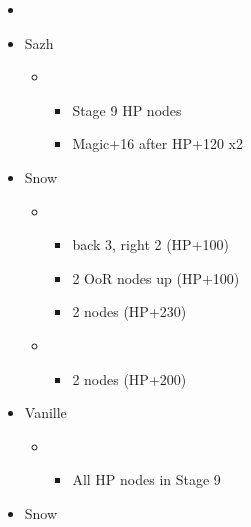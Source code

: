 \begin{menu}
	\begin{itemize}
	\paradigm
		\begin{itemize}
			\item {}%
				{\paradigmline{(\rav)}{\sen}{(\rav)}}%
				{\paradigmline{\com}{\com}{\sab}}%
				{\paradigmline{\syn}{\sen}{(\med)}}%
				{\paradigmline{\rav}{(\sen)}{(\med)}}%
				{\paradigmline[4]{\sab}{\sen}{\sab}}%
				{\paradigmline{\rav}{\sen}{\rav}}%
		\end{itemize}
	\crystarium
		\begin{itemize}
			\item Sazh
				\begin{itemize}
					\item \rav
						\begin{itemize}
							\item Stage 9 HP nodes
							\item Magic+16 after HP+120 x2
						\end{itemize}
				\end{itemize}
			\item Snow
				\begin{itemize}
					\item \com
						\begin{itemize}
							\item back 3, right 2 (HP+100)
							\item 2 OoR nodes up (HP+100)
							\item 2 nodes (HP+230)
						\end{itemize}
					\item \sen
						\begin{itemize}
							\item 2 nodes (HP+200)
						\end{itemize}
				\end{itemize}
			\item Vanille
				\begin{itemize}
					\item \med
						\begin{itemize}
							\item All HP nodes in Stage 9
						\end{itemize}
				\end{itemize}								
		\end{itemize}
	\equip
		\begin{itemize}
			\item Snow
				\begin{itemize}

\end{itemize}
\end{itemize}
\end{itemize}
\end{menu}
